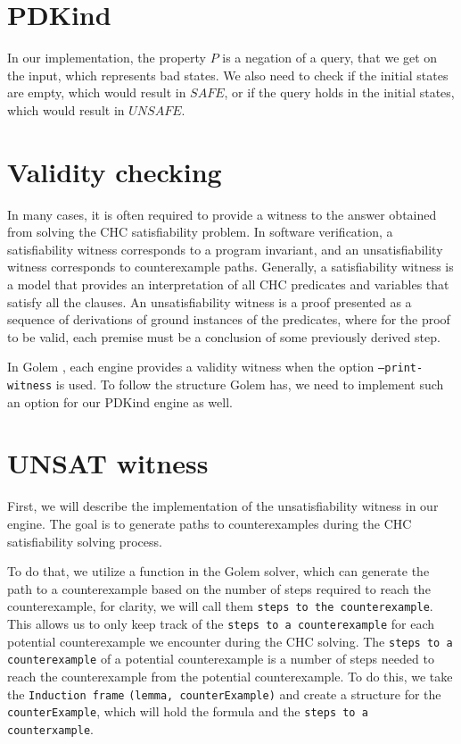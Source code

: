 \section*{PDKind}
In our implementation, the property \( P \) is a negation of a query, that
we get on the input, which represents bad states. We also need to check if the
initial states are empty, which would result in \( SAFE \), or if the query
holds in the initial states, which would result in \( UNSAFE \).

\section{Validity checking}
\noindent In many cases, it is often required to provide a witness to the
answer obtained from solving the CHC satisfiability problem. In software
verification, a satisfiability witness corresponds to a program invariant, and
an unsatisfiability witness corresponds to counterexample paths. Generally, a
satisfiability witness is a model that provides an interpretation of all CHC
predicates and variables that satisfy all the clauses. An unsatisfiability
witness is a proof presented as a sequence of derivations of ground instances
of the predicates, where for the proof to be valid, each premise must be a
conclusion of some previously derived step.

In Golem \cite{blicha_golem_2023}, each engine provides a validity witness when
the option \texttt{--print-witness} is used. To follow the structure Golem has,
we need to implement such an option for our PDKind engine as well.

\section*{UNSAT witness} \label{UNSATWit}
\noindent First, we will describe the implementation of the unsatisfiability
witness in our engine. The goal is to generate paths to counterexamples during
the CHC satisfiability solving process.

To do that, we utilize a function in the Golem solver, which can generate the
path to a counterexample based on the number of steps required to reach the
counterexample, for clarity, we will call them \texttt{steps to the
counterexample}. This allows us to only keep track of the \texttt{steps to a
counterexample} for each potential counterexample we encounter during the CHC
solving. The \texttt{steps to a counterexample} of a potential counterexample
is a number of steps needed to reach the counterexample from the potential
counterexample. To do this, we take the \texttt{Induction frame}
\texttt{(lemma, counterExample)} and create a structure for the
\texttt{counterExample}, which will hold the formula and the \texttt{steps to a
counterxample}.

